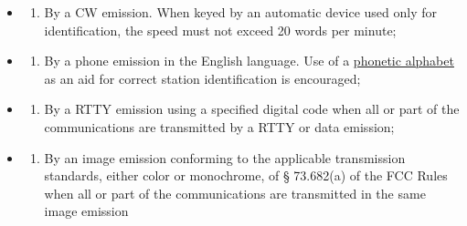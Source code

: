 \documentclass[
  letterpaper,
  DIV=11,
  numbers=noendperiod]{scrreport}
\providecommand{\tightlist}{%
  \setlength{\itemsep}{0pt}\setlength{\parskip}{0pt}}\usepackage{longtable,booktabs,array}
\begin{document}
\begin{itemize}
\item
  \begin{enumerate}
  \def\labelenumi{(\arabic{enumi})}
  \tightlist
  \item
    By a CW emission. When keyed by an automatic device used only for
    identification, the speed must not exceed 20 words per minute;
  \end{enumerate}
\item
  \begin{enumerate}
  \def\labelenumi{(\arabic{enumi})}
  \setcounter{enumi}{1}
  \tightlist
  \item
    By a phone emission in the English language. Use of a
    \protect\hyperlink{phonetic-alphabet}{phonetic alphabet} as an aid
    for correct station identification is encouraged;
  \end{enumerate}
\item
  \begin{enumerate}
  \def\labelenumi{(\arabic{enumi})}
  \setcounter{enumi}{2}
  \tightlist
  \item
    By a RTTY emission using a specified digital code when all or part
    of the communications are transmitted by a RTTY or data emission;
  \end{enumerate}
\item
  \begin{enumerate}
  \def\labelenumi{(\arabic{enumi})}
  \setcounter{enumi}{3}
  \tightlist
  \item
    By an image emission conforming to the applicable transmission
    standards, either color or monochrome, of § 73.682(a) of the FCC
    Rules when all or part of the communications are transmitted in the
    same image emission
  \end{enumerate}
\end{itemize}
\end{document}
